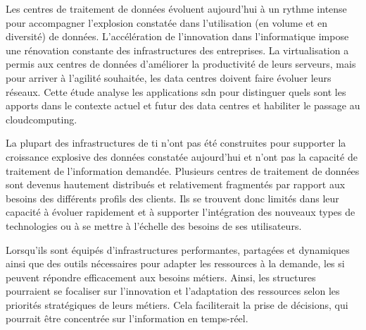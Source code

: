 


Les centres de traitement de données évoluent aujourd'hui à un rythme intense pour accompagner l'explosion constatée dans l'utilisation (en volume et en diversité) de données. L'accélération de l'innovation dans l'informatique impose une rénovation constante des infrastructures des entreprises. La virtualisation a permis aux centres de données d'améliorer la productivité de leurs serveurs, mais pour arriver à l'agilité souhaitée, les data centres doivent faire évoluer leurs réseaux. %
Cette étude analyse les applications \gls{sdn} pour distinguer quels sont les apports dans le contexte actuel et futur des data centres et habiliter le passage au \gls{cloudcomputing}.

\par 
La plupart des infrastructures de \gls{ti} n'ont pas été construites pour supporter la croissance explosive des données constatée aujourd'hui et n'ont pas la capacité de traitement de l'information demandée. Plusieurs centres de traitement de données sont devenus hautement distribués et relativement fragmentés par rapport aux besoins des différents profils des clients. Ils se trouvent donc limités dans leur capacité à évoluer rapidement et à supporter l'intégration des nouveaux types de technologies ou à se mettre à l'échelle des besoins de ses utilisateurs.

\par 
Lorsqu'ils sont équipés d'infrastructures performantes, partagées et dynamiques ainsi que des outils nécessaires pour adapter les ressources à la demande, les \gls{si} peuvent répondre efficacement aux besoins métiers. Ainsi, les structures pourraient se focaliser sur l'innovation et l'adaptation des ressources selon les priorités stratégiques de leurs métiers. Cela faciliterait la prise de décisions, qui pourrait être concentrée sur l'information en temps-réel. \cite{hpAlcatelCreatinCloudDCchallenges}

